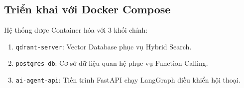 \subsection{Triển khai với Docker Compose}
Hệ thống được Container hóa với 3 khối chính:
\begin{enumerate}
    \item \texttt{qdrant-server}: Vector Database phục vụ Hybrid Search.
    \item \texttt{postgres-db}: Cơ sở dữ liệu quan hệ phục vụ Function Calling.
    \item \texttt{ai-agent-api}: Tiến trình FastAPI chạy LangGraph điều khiển hội thoại.
\end{enumerate}
